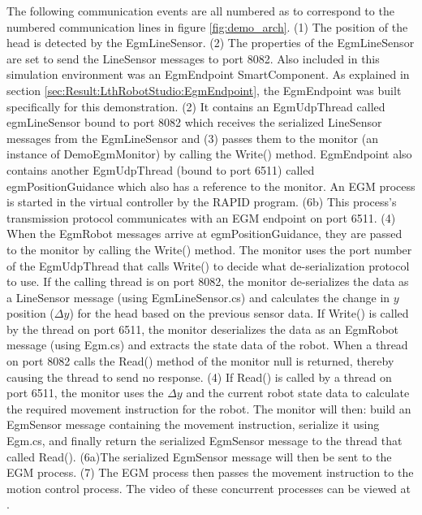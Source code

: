 \documentclass{cslthse-msc}
\begin{document}
The following communication events are all numbered as to correspond to the numbered communication lines in figure \ref{fig:demo_arch}. (1) The position of the head is detected by the EgmLineSensor. (2) The properties of the EgmLineSensor are set to send the LineSensor messages to port 8082. Also included in this simulation environment was an EgmEndpoint SmartComponent. As explained in section \ref{sec:Result:LthRobotStudio:EgmEndpoint}, the EgmEndpoint was built specifically for this demonstration. (2) It contains an EgmUdpThread called egmLineSensor bound to port 8082 which receives the serialized LineSensor messages from the EgmLineSensor and (3) passes them to the monitor (an instance of DemoEgmMonitor) by calling the Write() method. EgmEndpoint also contains another EgmUdpThread (bound to port 6511) called egmPositionGuidance which also has a reference to the monitor. An EGM process is started in the virtual controller by the RAPID program. (6b) This process's transmission protocol communicates with an EGM endpoint on port 6511. (4) When the EgmRobot messages arrive at egmPositionGuidance, they are passed to the monitor by calling the Write() method. The monitor uses the port number of the EgmUdpThread that calls Write() to decide what de-serialization protocol to use. If the calling thread is on port 8082, the monitor de-serializes the data as a LineSensor message (using EgmLineSensor.cs) and calculates the change in $y$ position ($\Delta y$) for the head based on the previous sensor data. If Write() is called by the thread on port 6511, the monitor deserializes the data as an EgmRobot message (using Egm.cs) and extracts the state data of the robot. When a thread on port 8082 calls the Read() method of the monitor null is returned, thereby causing the thread to send no response. (4) If Read() is called by a thread on port 6511, the monitor uses the $\Delta y$ and the current robot state data to calculate the required movement instruction for the robot. The monitor will then: build an EgmSensor message containing the movement instruction, serialize it using Egm.cs, and finally return the serialized EgmSensor message to the thread that called Read(). (6a)The serialized EgmSensor message will then be sent to the EGM process. (7) The EGM process then passes the movement instruction to the motion control process. The video of these concurrent processes can be viewed at \cite{Greg:Final_Demo}. 
\end{document}
